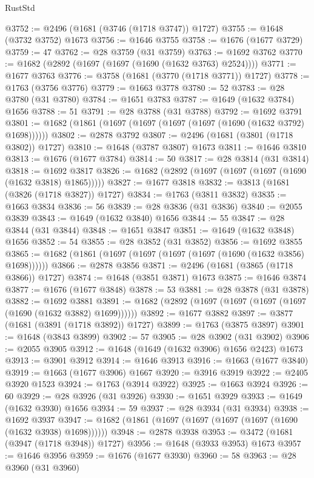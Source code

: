 \begin{lexlean}{RustStd}
\begin{coremodule}
{\begin{coremodule}
{{{{{{{{{{{{{{{{{{{{{{{{{{{{{{{{{{{{{{{{{{{{@3752 := @2496 (@1681 (@3746 (@1718 @3747)) @1727)
@3755 := @1648 (@3732 @3752) @1673
@3756 := @1646 @3755
@3758 := @1676 (@1677 @3729)
@3759 := 47
@3762 := @28 @3759 (@31 @3759)
@3763 := @1692 @3762
@3770 := @1682 (@2892 (@1697 (@1697 (@1690 (@1632 @3763) @2524))))
@3771 := @1677 @3763
@3776 := @3758 (@1681 (@3770 (@1718 @3771)) @1727)
@3778 := @1763 (@3756 @3776)
@3779 := @1663 @3778
@3780 := 52
@3783 := @28 @3780 (@31 @3780)
@3784 := @1651 @3783
@3787 := @1649 (@1632 @3784) @1656
@3788 := 51
@3791 := @28 @3788 (@31 @3788)
@3792 := @1692 @3791
@3801 := @1682 (@1861 (@1697 (@1697 (@1697 (@1697 (@1690 (@1632 @3792) @1698))))))
@3802 := @2878 @3792
@3807 := @2496 (@1681 (@3801 (@1718 @3802)) @1727)
@3810 := @1648 (@3787 @3807) @1673
@3811 := @1646 @3810
@3813 := @1676 (@1677 @3784)
@3814 := 50
@3817 := @28 @3814 (@31 @3814)
@3818 := @1692 @3817
@3826 := @1682 (@2892 (@1697 (@1697 (@1697 (@1690 (@1632 @3818) @1865)))))
@3827 := @1677 @3818
@3832 := @3813 (@1681 (@3826 (@1718 @3827)) @1727)
@3834 := @1763 (@3811 @3832)
@3835 := @1663 @3834
@3836 := 56
@3839 := @28 @3836 (@31 @3836)
@3840 := @2055 @3839
@3843 := @1649 (@1632 @3840) @1656
@3844 := 55
@3847 := @28 @3844 (@31 @3844)
@3848 := @1651 @3847
@3851 := @1649 (@1632 @3848) @1656
@3852 := 54
@3855 := @28 @3852 (@31 @3852)
@3856 := @1692 @3855
@3865 := @1682 (@1861 (@1697 (@1697 (@1697 (@1697 (@1690 (@1632 @3856) @1698))))))
@3866 := @2878 @3856
@3871 := @2496 (@1681 (@3865 (@1718 @3866)) @1727)
@3874 := @1648 (@3851 @3871) @1673
@3875 := @1646 @3874
@3877 := @1676 (@1677 @3848)
@3878 := 53
@3881 := @28 @3878 (@31 @3878)
@3882 := @1692 @3881
@3891 := @1682 (@2892 (@1697 (@1697 (@1697 (@1697 (@1690 (@1632 @3882) @1699))))))
@3892 := @1677 @3882
@3897 := @3877 (@1681 (@3891 (@1718 @3892)) @1727)
@3899 := @1763 (@3875 @3897)
@3901 := @1648 (@3843 @3899)
@3902 := 57
@3905 := @28 @3902 (@31 @3902)
@3906 := @2055 @3905
@3912 := @1648 (@1649 (@1632 @3906) @1656 @2423) @1673
@3913 := @3901 @3912
@3914 := @1646 @3913
@3916 := @1663 (@1677 @3840)
@3919 := @1663 (@1677 @3906) @1667
@3920 := @3916 @3919
@3922 := @2405 @3920 @1523
@3924 := @1763 (@3914 @3922)
@3925 := @1663 @3924
@3926 := 60
@3929 := @28 @3926 (@31 @3926)
@3930 := @1651 @3929
@3933 := @1649 (@1632 @3930) @1656
@3934 := 59
@3937 := @28 @3934 (@31 @3934)
@3938 := @1692 @3937
@3947 := @1682 (@1861 (@1697 (@1697 (@1697 (@1697 (@1690 (@1632 @3938) @1698))))))
@3948 := @2878 @3938
@3953 := @3472 (@1681 (@3947 (@1718 @3948)) @1727)
@3956 := @1648 (@3933 @3953) @1673
@3957 := @1646 @3956
@3959 := @1676 (@1677 @3930)
@3960 := 58
@3963 := @28 @3960 (@31 @3960)
}}}}}}}}}}}}}}}}}}}}}}}}}}}}}}}}}}}}}}}}}}}}
\end{coremodule}}
\end{coremodule}
\end{lexlean}
